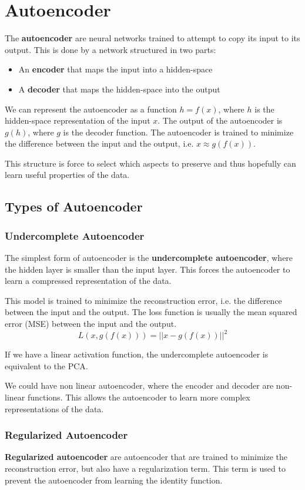 \chapter{Autoencoder}
The \textbf{autoencoder} are neural networks trained to attempt to copy its
input to its output. This is done by a network structured in two parts:
\begin{itemize}
    \item An \textbf{encoder} that maps the input into a hidden-space
    \item A \textbf{decoder} that maps the hidden-space into the output
\end{itemize}

We can represent the autoencoder as a function $h = f(x)$, where $h$ is the
hidden-space representation of the input $x$. The output of the autoencoder is
$g(h)$, where $g$ is the decoder function. The autoencoder is trained to minimize
the difference between the input and the output, i.e. $x \approx g(f(x))$.

This structure is force to select which aspects to preserve and thus hopefully
can learn useful properties of the data.
\section{Types of Autoencoder}
\subsection{Undercomplete Autoencoder}
The simplest form of autoencoder is the \textbf{undercomplete autoencoder}, where
the hidden layer is smaller than the input layer. This forces the autoencoder to
learn a compressed representation of the data.

This model is trained to minimize the reconstruction error, i.e. the difference
between the input and the output. The loss function is usually the mean squared
error (MSE) between the input and the output.
\begin{equation*}
    L(x, g(f(x))) = ||x - g(f(x))||^2
\end{equation*}
\begin{note}
    If we have a linear activation function, the undercomplete autoencoder is
    equivalent to the PCA.
\end{note}

We could have non linear autoencoder, where the encoder and decoder are non-linear
functions. This allows the autoencoder to learn more complex representations of
the data.
\subsection{Regularized Autoencoder}
\textbf{Regularized autoencoder} are autoencoder that are trained to minimize the
reconstruction error, but also have a regularization term. This term is used to
prevent the autoencoder from learning the identity function.

